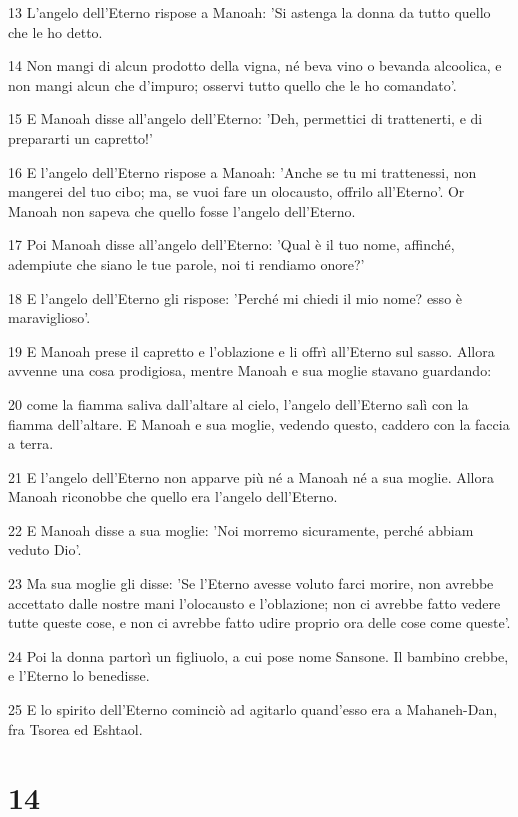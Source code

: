 \par 13 L'angelo dell'Eterno rispose a Manoah: 'Si astenga la donna da tutto quello che le ho detto.
\par 14 Non mangi di alcun prodotto della vigna, né beva vino o bevanda alcoolica, e non mangi alcun che d'impuro; osservi tutto quello che le ho comandato'.
\par 15 E Manoah disse all'angelo dell'Eterno: 'Deh, permettici di trattenerti, e di prepararti un capretto!'
\par 16 E l'angelo dell'Eterno rispose a Manoah: 'Anche se tu mi trattenessi, non mangerei del tuo cibo; ma, se vuoi fare un olocausto, offrilo all'Eterno'. Or Manoah non sapeva che quello fosse l'angelo dell'Eterno.
\par 17 Poi Manoah disse all'angelo dell'Eterno: 'Qual è il tuo nome, affinché, adempiute che siano le tue parole, noi ti rendiamo onore?'
\par 18 E l'angelo dell'Eterno gli rispose: 'Perché mi chiedi il mio nome? esso è maraviglioso'.
\par 19 E Manoah prese il capretto e l'oblazione e li offrì all'Eterno sul sasso. Allora avvenne una cosa prodigiosa, mentre Manoah e sua moglie stavano guardando:
\par 20 come la fiamma saliva dall'altare al cielo, l'angelo dell'Eterno salì con la fiamma dell'altare. E Manoah e sua moglie, vedendo questo, caddero con la faccia a terra.
\par 21 E l'angelo dell'Eterno non apparve più né a Manoah né a sua moglie. Allora Manoah riconobbe che quello era l'angelo dell'Eterno.
\par 22 E Manoah disse a sua moglie: 'Noi morremo sicuramente, perché abbiam veduto Dio'.
\par 23 Ma sua moglie gli disse: 'Se l'Eterno avesse voluto farci morire, non avrebbe accettato dalle nostre mani l'olocausto e l'oblazione; non ci avrebbe fatto vedere tutte queste cose, e non ci avrebbe fatto udire proprio ora delle cose come queste'.
\par 24 Poi la donna partorì un figliuolo, a cui pose nome Sansone. Il bambino crebbe, e l'Eterno lo benedisse.
\par 25 E lo spirito dell'Eterno cominciò ad agitarlo quand'esso era a Mahaneh-Dan, fra Tsorea ed Eshtaol.

\chapter{14}

